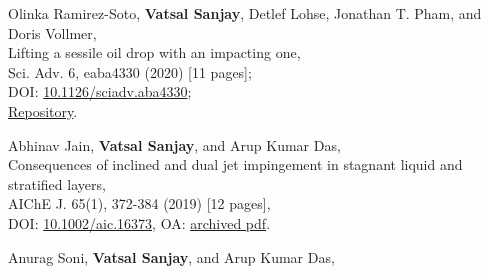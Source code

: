 	\item Olinka Ramirez-Soto, \textbf{Vatsal Sanjay}, Detlef Lohse, Jonathan T. Pham, and Doris Vollmer,\\
	Lifting a sessile oil drop with an impacting one,\\
	Sci. Adv. 6, eaba4330 (2020) [11 pages];\\
	\faFile\hspace{0.2em}DOI: \href{https://doi.org/10.1126/sciadv.aba4330}{10.1126/sciadv.aba4330};\\
	\faGithub\hspace{0.2em}\href{https://github.com/VatsalSy/Lifting-a-sessile-drop}{Repository}.

	\item Abhinav Jain, \textbf{Vatsal Sanjay}, and Arup Kumar Das,\\
	Consequences of inclined and dual jet impingement in stagnant liquid and stratified layers,\\
	AIChE J. 65(1), 372-384 (2019) [12 pages],\\
	\faLock\hspace{0.2em}DOI: \href{https://doi.org/10.1002/aic.16373}{10.1002/aic.16373}, \faFile\hspace{0.2em}OA: \href{https://tinyurl.com/24p5dy8s}{archived pdf}.

	\item Anurag Soni, \textbf{Vatsal Sanjay}, and Arup Kumar Das,\\
